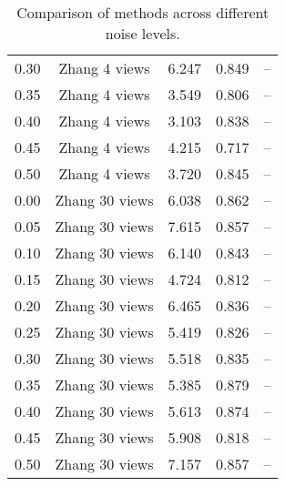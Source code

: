\begin{table}[H]
\begin{tabular}{l c l l l}
0.30 & Zhang 4 views & 6.247 & 0.849 & -- \\
0.35 & Zhang 4 views & 3.549 & 0.806 & -- \\
0.40 & Zhang 4 views & 3.103 & 0.838 & -- \\
0.45 & Zhang 4 views & 4.215 & 0.717 & -- \\
0.50 & Zhang 4 views & 3.720 & 0.845 & -- \\
\midrule
0.00 & Zhang 30 views & 6.038 & 0.862 & -- \\
0.05 & Zhang 30 views & 7.615 & 0.857 & -- \\
0.10 & Zhang 30 views & 6.140 & 0.843 & -- \\
0.15 & Zhang 30 views & 4.724 & 0.812 & -- \\
0.20 & Zhang 30 views & 6.465 & 0.836 & -- \\
0.25 & Zhang 30 views & 5.419 & 0.826 & -- \\
0.30 & Zhang 30 views & 5.518 & 0.835 & -- \\
0.35 & Zhang 30 views & 5.385 & 0.879 & -- \\
0.40 & Zhang 30 views & 5.613 & 0.874 & -- \\
0.45 & Zhang 30 views & 5.908 & 0.818 & -- \\
0.50 & Zhang 30 views & 7.157 & 0.857 & -- \\
\midrule
\bottomrule
\end{tabular}
\label{tab:SyntheticNoise}
\caption{Comparison of methods across different noise levels.}
\end{table}
